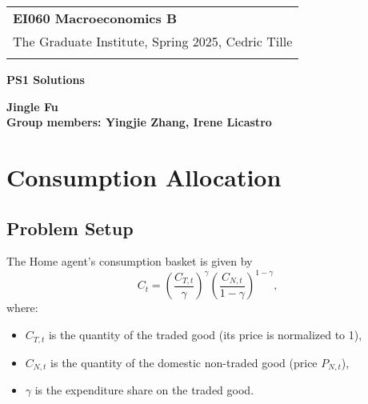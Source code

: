 \documentclass[a4paper,12pt]{article} %
\theoremstyle{nonitalic}
\begin{document}
\thispagestyle{empty} %

\begin{tabular}{p{15.5cm}} %
{\large \bf EI060 Macroeconomics B} \\
The Graduate Institute, Spring 2025, Cedric Tille\\
\hline %
\\
\end{tabular} %

\vspace*{0.3cm} %

\begin{center} %
	{\Large \bf PS1 Solutions} %
	\vspace{2mm}
	
	{\bf Jingle Fu \\ Group members: Yingjie Zhang, Irene Licastro} %
		
\end{center}  

\vspace{0.4cm}

\section{Consumption Allocation}

\subsection*{Problem Setup}
The Home agent's consumption basket is given by
\[
C_t = \left(\frac{C_{T,t}}{\gamma } \right)^{\gamma} \left(\frac{C_{N,t}}{1 - \gamma} \right)^{ 1-\gamma},
\]
where:
\begin{itemize}
    \item $C_{T,t}$ is the quantity of the traded good (its price is normalized to 1),
    \item $C_{N,t}$ is the quantity of the domestic non-traded good (price $P_{N,t}$),
    \item $\gamma$ is the expenditure share on the traded good.
\end{itemize}
\end{document}
